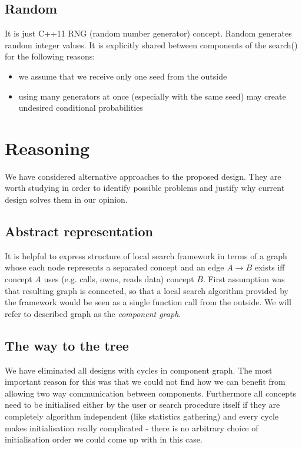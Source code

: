 \subsection{Random}

It is just C++11 RNG (random number generator) concept.
Random generates random integer values.
It is explicitly shared between components of the search() for the following reasons:
\begin{itemize}
\item we assume that we receive only one seed from the outside
\item using many generators at once (especially with the same seed) may create undesired conditional probabilities
\end{itemize}

\section{Reasoning}

We have considered alternative approaches to the proposed design. They are
worth studying in order to identify possible problems and justify why current design
solves them in our opinion.

\subsection{Abstract representation}
It is helpful to express structure of local search framework in terms of a
graph whose each node represents a separated concept and an edge $A \to B$
exists iff concept $A$ uses (e.g. calls, owns, reads data) concept $B$. First
assumption was that resulting graph is connected, so that a local search algorithm
provided by the framework would be seen as a single function call from the outside.
We will refer to described graph as the \emph{component graph}.

\subsection{The way to the tree}
We have eliminated all designs with cycles in component graph. The most
important reason for this was that we could not find how we can benefit from
allowing two way communication between components. Furthermore all concepts
need to be initialised either by the user or search procedure itself if they are
completely algorithm independent (like statistics gathering) and every cycle
makes initialisation really complicated - there is no arbitrary choice of
initialisation order we could come up with in this case.

